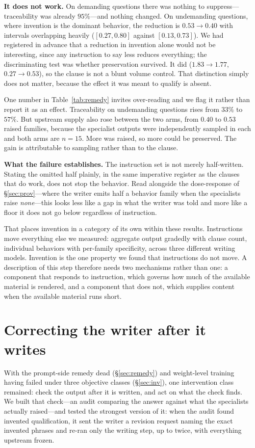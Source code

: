 \documentclass[11pt]{article}
\begin{document}
\textbf{It does not work.} On demanding questions there was nothing to
suppress---traceability was already $95\%$---and nothing changed. On
undemanding questions, where invention is the dominant behavior, the
reduction is $0.53 \rightarrow 0.40$ with intervals overlapping heavily
($[0.27,0.80]$ against $[0.13,0.73]$). We had registered in advance that a
reduction in invention alone would not be interesting, since any instruction
to say less reduces everything; the discriminating test was whether
preservation survived. It did ($1.83 \rightarrow 1.77$, $0.27 \rightarrow
0.53$), so the clause is not a blunt volume control. That distinction simply
does not matter, because the effect it was meant to qualify is absent.

One number in Table~\ref{tab:remedy} invites over-reading and we flag it
rather than report it as an effect. Traceability on undemanding questions
rises from $33\%$ to $57\%$. But upstream supply also rose between the two
arms, from $0.40$ to $0.53$ raised families, because the specialist outputs
were independently sampled in each and both arms are $n{=}15$. More was
raised, so more could be preserved. The gain is attributable to sampling
rather than to the clause.

\textbf{What the failure establishes.} The instruction set is not merely
half-written. Stating the omitted half plainly, in the same imperative
register as the clauses that do work, does not stop the behavior. Read
alongside the dose-response of \S\ref{sec:prov}---where the writer emits half
a behavior family when the specialists raise \emph{none}---this looks less
like a gap in what the writer was told and more like a floor it does not go
below regardless of instruction.

That places invention in a category of its own within these results.
Instructions move everything else we measured: aggregate output gradedly with
clause count, individual behaviors with per-family specificity, across three
different writing models. Invention is the one property we found that
instructions do not move. A description of this step therefore needs two
mechanisms rather than one: a component that responds to instruction, which
governs how much of the available material is rendered, and a component that
does not, which supplies content when the available material runs short.


\section{Correcting the writer after it writes}
\label{sec:gate}
With the prompt-side remedy dead (\S\ref{sec:remedy}) and weight-level
training having failed under three objective classes (\S\ref{sec:inv}), one
intervention class remained: check the output after it is written, and act on
what the check finds. We built that check---an audit comparing the answer
against what the specialists actually raised---and tested the strongest
version of it: when the audit found invented qualification, it sent the
writer a revision request naming the exact invented phrases and re-ran only
the writing step, up to twice, with everything upstream frozen.
\end{document}
